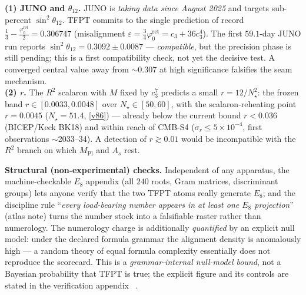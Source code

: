 \documentclass[11pt,a4paper]{article}
\newcommand{\cthree}{c_3}
\newcommand{\phiz}{\varphi_0^{\mathrm{ret}}}
\newcommand{\Mpl}{M_{\mathrm{Pl}}}
\begin{document}
\begin{winboxnb}
\textbf{(1) JUNO and $\theta_{12}$.} JUNO is \emph{taking data since August 2025} and targets sub-percent
$\sin^2\theta_{12}$. TFPT commits to the single prediction of record
$\tfrac13-\tfrac{\phiz}{2}=0.306747$ (misalignment $\varepsilon=\tfrac34\phiz=\cthree+36\cthree^4$). The
first $59.1$-day JUNO run reports $\sin^2\theta_{12}=0.3092\pm0.0087$ --- \emph{compatible}, but the
precision phase is still pending; this is a first compatibility check, not yet the decisive test. A
converged central value away from $\sim0.307$ at high significance falsifies the seam mechanism.\\[2pt]
\textbf{(2) $r$.} The $R^2$ scalaron with $M$ fixed by $\cthree^7$ predicts a small $r=12/N_\star^2$:
the frozen band $r\in[0.0033,0.0048]$ over $N_\star\in[50,60]$, with the scalaron-reheating point
$r=0.0045$ ($N_\star{=}51.4$, \vref{v86}) --- already below the current bound $r<0.036$ (BICEP/Keck BK18)
and within reach of CMB-S4 ($\sigma_r\!\le\!5\times10^{-4}$, first observations $\sim$2033--34). A
detection of $r\gtrsim0.01$ would be incompatible with the $R^2$ branch on which $\Mpl$ and $A_s$ rest.
\end{winboxnb}

\noindent\textbf{Structural (non-experimental) checks.} Independent of any apparatus, the
machine-checkable $E_8$ appendix (all $240$ roots, Gram matrices, discriminant groups) lets anyone verify
that the two TFPT atoms really generate $E_8$; and the discipline rule ``\emph{every load-bearing number
appears in at least one $E_8$ projection}'' (atlas note) turns the number stock into a falsifiable raster
rather than numerology. The numerology charge is additionally \emph{quantified} by an explicit null model:
under the declared formula grammar the alignment density is anomalously high --- a random theory of equal
formula complexity essentially does not reproduce the scorecard. This is a \emph{grammar-internal null-model
bound}, not a Bayesian probability that TFPT is true; the explicit figure and its controls are stated in the
verification appendix \mE\ .
\end{document}
